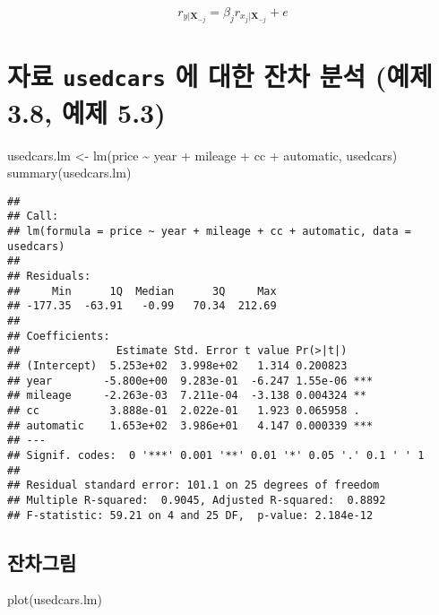 \documentclass[
]{book}
\newenvironment{Shaded}{\begin{snugshade}}{\end{snugshade}}
\newcommand{\FunctionTok}[1]{\textcolor[rgb]{0.00,0.00,0.00}{#1}}
\newcommand{\NormalTok}[1]{#1}
\newcommand{\OtherTok}[1]{\textcolor[rgb]{0.56,0.35,0.01}{#1}}
\newcommand{\SpecialCharTok}[1]{\textcolor[rgb]{0.00,0.00,0.00}{#1}}
\begin{document}
\[
r_{y|\bm X_{-j}} = \beta_j r_{x_j|\bm X_{-j}} + e 
\]

\hypertarget{uxc790uxb8cc-usedcars-uxc5d0-uxb300uxd55c-uxc794uxcc28-uxbd84uxc11d-uxc608uxc81c-3.8-uxc608uxc81c-5.3}{%
\section{\texorpdfstring{자료 \texttt{usedcars} 에 대한 잔차 분석 (예제 3.8, 예제 5.3)}{자료 usedcars 에 대한 잔차 분석 (예제 3.8, 예제 5.3)}}\label{uxc790uxb8cc-usedcars-uxc5d0-uxb300uxd55c-uxc794uxcc28-uxbd84uxc11d-uxc608uxc81c-3.8-uxc608uxc81c-5.3}}

\begin{Shaded}
\begin{Highlighting}[]
\NormalTok{usedcars.lm }\OtherTok{\textless{}{-}} \FunctionTok{lm}\NormalTok{(price }\SpecialCharTok{\textasciitilde{}}\NormalTok{ year }\SpecialCharTok{+}\NormalTok{ mileage }\SpecialCharTok{+}\NormalTok{ cc }\SpecialCharTok{+}\NormalTok{ automatic, usedcars)}
\FunctionTok{summary}\NormalTok{(usedcars.lm)}
\end{Highlighting}
\end{Shaded}

\begin{verbatim}
## 
## Call:
## lm(formula = price ~ year + mileage + cc + automatic, data = usedcars)
## 
## Residuals:
##     Min      1Q  Median      3Q     Max 
## -177.35  -63.91   -0.99   70.34  212.69 
## 
## Coefficients:
##               Estimate Std. Error t value Pr(>|t|)    
## (Intercept)  5.253e+02  3.998e+02   1.314 0.200823    
## year        -5.800e+00  9.283e-01  -6.247 1.55e-06 ***
## mileage     -2.263e-03  7.211e-04  -3.138 0.004324 ** 
## cc           3.888e-01  2.022e-01   1.923 0.065958 .  
## automatic    1.653e+02  3.986e+01   4.147 0.000339 ***
## ---
## Signif. codes:  0 '***' 0.001 '**' 0.01 '*' 0.05 '.' 0.1 ' ' 1
## 
## Residual standard error: 101.1 on 25 degrees of freedom
## Multiple R-squared:  0.9045, Adjusted R-squared:  0.8892 
## F-statistic: 59.21 on 4 and 25 DF,  p-value: 2.184e-12
\end{verbatim}

\hypertarget{uxc794uxcc28uxadf8uxb9bc}{%
\subsection{잔차그림}\label{uxc794uxcc28uxadf8uxb9bc}}

\begin{Shaded}
\begin{Highlighting}[]
\FunctionTok{plot}\NormalTok{(usedcars.lm)}
\end{Highlighting}
\end{Shaded}
\end{document}

